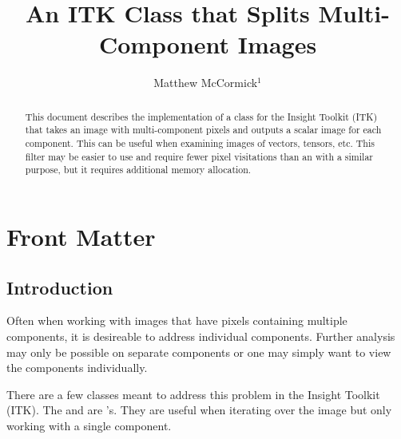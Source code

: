 \documentclass{InsightArticle}
\title{An ITK Class that Splits Multi-Component Images}
\author{Matthew McCormick$^{1}$}
\newcommand{\IJhandlerIDnumber}{3230}
\begin{document}
%
%
\IJhandlefooter{\IJhandlerIDnumber}


\ifpdf
\else
\fi


\maketitle


\ifhtml
\chapter*{Front Matter\label{front}}
\fi


\begin{abstract} \noindent This document describes the implementation of a class
for the Insight Toolkit (ITK) that takes an image with multi-component pixels and
outputs a scalar image for each component.  This can be useful when examining images
of vectors, tensors, etc.  This filter may be easier to use and require fewer
pixel visitations than an  with a similar purpose,
but it requires additional memory allocation.
\end{abstract}

\IJhandlenote{\IJhandlerIDnumber}

\tableofcontents

\section{Introduction}

Often when working with images that have pixels containing multiple components,
it is desireable to address individual components.  Further analysis may only be
possible on separate components or one may simply want to view the components
individually.

There are a few classes meant to address this problem in the Insight Toolkit
(ITK).  The  and 
are 's.  They are useful when iterating over the image but
only working with a single component.
\end{document}
